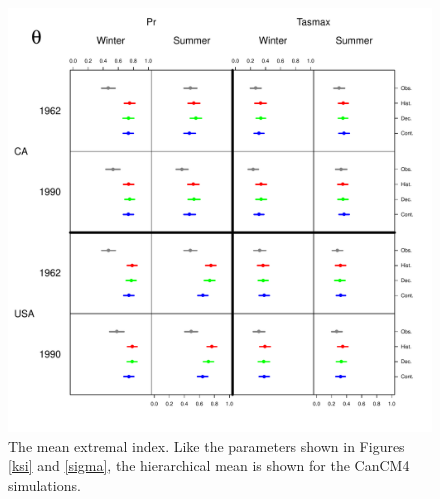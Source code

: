\documentclass[12pt]{article}
\begin{document}
\begin{figure}
\begin{center}
\includegraphics[scale=0.72]{figs/theta.pdf}
\end{center}
\caption{The mean extremal index. Like the parameters shown in Figures \ref{ksi} and \ref{sigma}, the hierarchical mean is shown for the CanCM4 simulations.}
\label{theta}
\end{figure}



% 
% 






\end{document}
